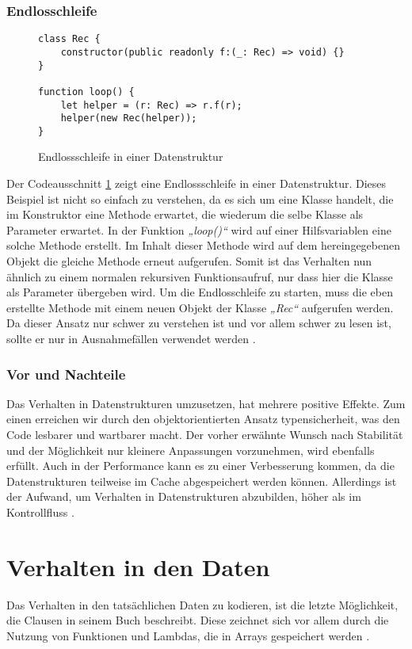 \subsubsection{Endlosschleife}
\begin{figure}[ht]
    \centering
        \begin{verbatim}
class Rec {
    constructor(public readonly f:(_: Rec) => void) {}
}

function loop() {
    let helper = (r: Rec) => r.f(r);
    helper(new Rec(helper));
}
        \end{verbatim}
    \caption{Endlossschleife in einer Datenstruktur \citep[S. 316]{fiveLines.2023}}
    \label{fig:DatenstrukturEndlossschleife}
\end{figure}
Der Codeausschnitt \ref{fig:DatenstrukturEndlossschleife} zeigt eine Endlossschleife in einer Datenstruktur.
Dieses Beispiel ist nicht so einfach zu verstehen, da es sich um eine Klasse handelt, die im Konstruktor eine Methode erwartet, die wiederum die selbe Klasse als Parameter erwartet.
In der Funktion \textit{„loop()“} wird auf einer Hilfsvariablen eine solche Methode erstellt.
Im Inhalt dieser Methode wird auf dem hereingegebenen Objekt die gleiche Methode erneut aufgerufen.
Somit ist das Verhalten nun ähnlich zu einem normalen rekursiven Funktionsaufruf, nur dass hier die Klasse als Parameter übergeben wird.
Um die Endlosschleife zu starten, muss die eben erstellte Methode mit einem neuen Objekt der Klasse \textit{„Rec“} aufgerufen werden.
Da dieser Ansatz nur schwer zu verstehen ist und vor allem schwer zu lesen ist, sollte er nur in Ausnahmefällen verwendet werden \citep[S. 316]{fiveLines.2023}.
\subsubsection{Vor und Nachteile}
Das Verhalten in Datenstrukturen umzusetzen, hat mehrere positive Effekte.
Zum einen erreichen wir durch den objektorientierten Ansatz typensicherheit, was den Code lesbarer und wartbarer macht.
Der vorher erwähnte Wunsch nach Stabilität und der Möglichkeit nur kleinere Anpassungen vorzunehmen, wird ebenfalls erfüllt.
Auch in der Performance kann es zu einer Verbesserung kommen, da die Datenstrukturen teilweise im Cache abgespeichert werden können.
Allerdings ist der Aufwand, um Verhalten in Datenstrukturen abzubilden, höher als im Kontrollfluss \citep[S.315 ff.]{fiveLines.2023}.
\newpage
\section{Verhalten in den Daten}
Das Verhalten in den tatsächlichen Daten zu kodieren, ist die letzte Möglichkeit, die Clausen in seinem Buch beschreibt.
Diese zeichnet sich vor allem durch die Nutzung von Funktionen und Lambdas, die in Arrays gespeichert werden \citep[S. 319 f.]{fiveLines.2023}.

